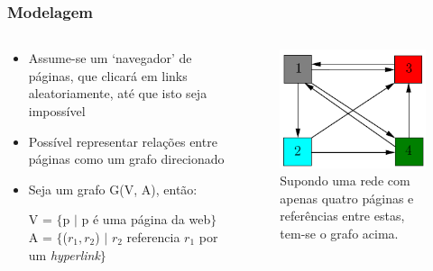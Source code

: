 \documentclass{beamer}
\begin{document}
\begin{frame}
    \frametitle{Modelagem}
    \begin{columns}[T]
        \begin{column}{.55\textwidth}
            \begin{itemize}
                \item Assume-se um `navegador' de páginas, que clicará em
                links aleatoriamente, até que isto seja impossível
                \item Possível representar relações entre páginas como um
                grafo direcionado
                \item Seja um grafo G(V, A), então:
                \begin{center}
                    V = $\{$p $\mid$ p é uma página da web$\}$ \\
                    A = $\{$($r_1, r_2$) $|$ $r_2$ referencia
                        $r_1$ por um \textit{hyperlink}$\}$
                \end{center}
            \end{itemize}
        \end{column}
        \begin{column}{.4\textwidth}
        \begin{figure}
            \includegraphics[scale=0.45]{pr_1}
            \caption{\tiny{Supondo uma rede com apenas quatro páginas e
            referências entre estas, tem-se o grafo acima.}}
        \end{figure}
        \end{column}
    \end{columns}
\end{frame}
\end{document}
